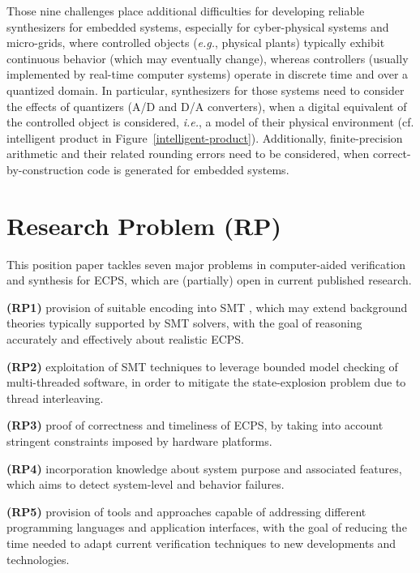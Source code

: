 \documentclass[format=acmsmall, review=false, screen=true]{acmart}
\begin{document}
Those nine challenges place additional difficulties for developing reliable synthesizers for embedded systems, especially for cyber-physical systems and micro-grids, where controlled objects ({\it e.g.}, physical plants) typically exhibit continuous behavior (which may eventually change), whereas controllers (usually implemented by real-time computer systems) operate in discrete time and over a quantized domain. In particular, synthesizers for those systems need to consider the effects of quantizers (A/D and D/A converters), when a digital equivalent of the controlled object is considered, {\it i.e.}, a model of their physical environment (cf. intelligent product in Figure~\ref{intelligent-product}). Additionally,  finite-precision arithmetic and their related rounding errors need to be considered, when correct-by-construction code is generated for embedded systems.

\section{Research Problem (RP)}
\label{Research-Problem}

This position paper tackles seven major problems in computer-aided verification and synthesis for ECPS, which are (partially) open in current published research.

\textbf{(RP1)} provision of suitable encoding into SMT \cite{BarrettSST09}, which may extend background theories typically supported by SMT solvers, with the goal of reasoning accurately and effectively about realistic ECPS.

\textbf{(RP2)} exploitation of SMT techniques to leverage bounded model checking of multi-threaded software, in order to mitigate the state-explosion problem due to thread interleaving.
	
\textbf{(RP3)} proof of correctness and timeliness of ECPS, by taking into account stringent constraints imposed by hardware platforms.
	
\textbf{(RP4)} incorporation knowledge about system purpose and associated features, which aims to detect system-level and behavior failures.

\textbf{(RP5)} provision of tools and approaches capable of addressing different programming languages and application interfaces, with the goal of reducing the time needed to adapt current verification techniques to new developments and technologies.
\end{document}
